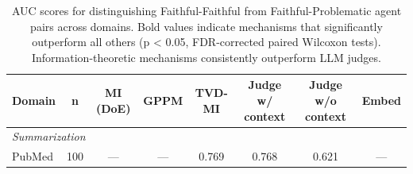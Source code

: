 \begin{table}[t]
\centering
\caption{AUC scores for distinguishing Faithful-Faithful from Faithful-Problematic agent pairs across domains. Bold values indicate mechanisms that significantly outperform all others (p < 0.05, FDR-corrected paired Wilcoxon tests). Information-theoretic mechanisms consistently outperform LLM judges.}
\label{tab:auc_results}
\begin{tabular}{lccccccc}
\toprule
\textbf{Domain} & \textbf{n} & \textbf{MI (DoE)} & \textbf{GPPM} & \textbf{TVD-MI} & \textbf{Judge w/ context} & \textbf{Judge w/o context} & \textbf{Embed} \\
\midrule
\multicolumn{8}{l}{\textit{Summarization}} \\
PubMed & 100 & — & — & 0.769 & 0.768 & 0.621 & — \\
\midrule
\bottomrule
\end{tabular}
\end{table}